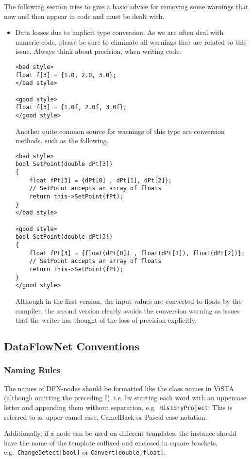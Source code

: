 The following section tries to give a basic advice for removing some warnings that now and then appear in code and must be dealt with.

\begin{itemize}
\item Data losses due to implicit type conversion.
	As we are often deal with numeric code, please be sure to eliminate all warnings that are related to this issue.
	Always think about precision, when writing code.
\begin{verbatim}
<bad style>
float f[3] = {1.0, 2.0, 3.0};
</bad style>

<good style>
float f[3] = {1.0f, 2.0f, 3.0f};
</good style>
\end{verbatim}
	Another quite common source for warnings of this type are conversion methods, such as the following.

\begin{verbatim}
<bad style>
bool SetPoint(double dPt[3])
{
	float fPt[3] = {dPt[0] , dPt[1], dPt[2]};
	// SetPoint accepts an array of floats
	return this->SetPoint(fPt);
}
</bad style>

<good style>
bool SetPoint(double dPt[3])
{
	float fPt[3] = {float(dPt[0]) , float(dPt[1]), float(dPt[2])};
	// SetPoint accepts an array of floats
	return this->SetPoint(fPt);
}
</good style>
\end{verbatim}
	Although in the first version, the input values are converted to floats by the compiler, the second version clearly avoids the conversion warning as issues that the writer has thought of the loss of precision explicitly.
\end{itemize}


\subsection{DataFlowNet Conventions}

\subsubsection{Naming Rules}

 The names of DFN-nodes should be formatted like the class names in ViSTA (although omitting the preceding I), i.e. by starting each word with an uppercase letter and appending them without separation, e.g.\ \texttt{HistoryProject}. 
This is referred to as upper camel case, CamelBack or Pascal case notation.

Additionally, if a node can be used on different templates, the instance should have the name of the template suffixed and enclosed in square brackets, e.g.\ \texttt{ChangeDetect[bool]} or \texttt{Convert[double,float]}.

